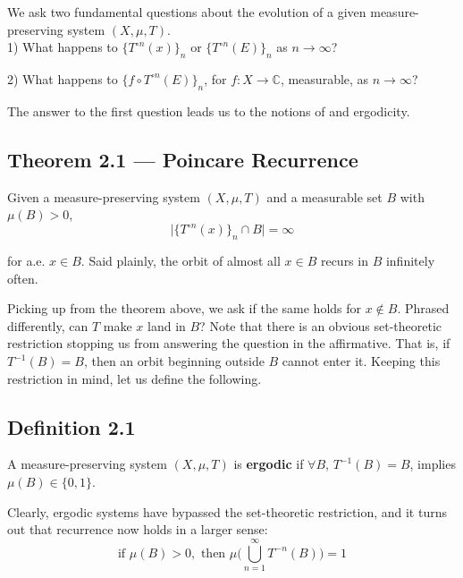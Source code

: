 \documentclass[11pt,a4paper]{article}
\begin{document}
We ask two fundamental questions about the evolution of a given measure-preserving system $(X, \mu, T)$.\\


1) What happens to $\{T^{\circ n}(x)\}_n$ or $\{T^{\circ n}(E)\}_n$ as $n\rightarrow \infty$?


2) What happens to $\{f\circ T^{\circ n}(E)\}_n$, for $f:X \rightarrow \mathbb{C}$, measurable, as $n\rightarrow \infty$?

The answer to the first question leads us to the notions of  and ergodicity.
\subsection*{Theorem 2.1 — Poincare Recurrence} Given a measure-preserving system $(X, \mu, T)$ and a measurable set $B$ with $\mu(B) >0$,
$$\big|\{T^{\circ n}(x)\}_n\cap B\big| = \infty$$

for a.e. $x\in B$. Said plainly, the orbit of almost all $x\in B$ recurs in $B$ infinitely often.


Picking up from the theorem above, we ask if the same holds for $x\notin B$.
Phrased differently, can $T$ make $x$ land in $B$? Note that there is an
obvious set-theoretic restriction stopping us from answering the question in
the affirmative. That is, if $T^{-1}(B)=B$, then an orbit beginning outside
$B$ cannot enter it. Keeping this restriction in mind, let us define the
following.
\subsection*{Definition 2.1}
    A measure-preserving system $(X, \mu, T)$ is \textbf{ergodic} if $\forall B$, $T^{-1}(B) = B$, implies $\mu(B) \in \{0,1\}$.


Clearly, ergodic systems have bypassed the set-theoretic restriction, and it
turns out that recurrence now holds in a larger sense:
$$\text{if }\mu(B)>0, \text{ then } \mu\Bigg(\bigcup_{n=1}^{\infty} T^{-n}(B)\Bigg) = 1$$
\end{document}
